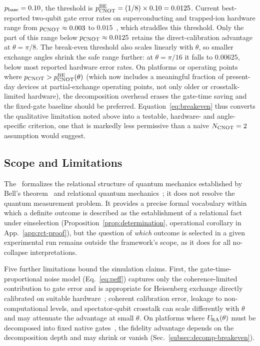 $p_{\rm base} = 0.10$, the threshold is
$p_{\rm CNOT}^{\rm BE} = (1/8)\times 0.10 = 0.0125$.
Current best-reported two-qubit gate error rates on superconducting
and trapped-ion hardware range from $p_{\rm CNOT} \approx 0.003$ to $0.015$~\cite{Krantz2019}, which straddles this threshold. Only the part of this range below $p_{\rm CNOT} \approx 0.0125$ retains the direct-calibration advantage at $\theta=\pi/8$. The break-even threshold also scales linearly with $\theta$, so smaller exchange angles shrink the safe range further: at $\theta = \pi/16$ it falls to $0.00625$, below most reported hardware error rates.
On platforms or operating points where $p_{\rm CNOT} > p_{\rm CNOT}^{\rm BE}(\theta)$ (which now includes a meaningful fraction of present-day devices at partial-exchange operating points, not only older or crosstalk-limited hardware), the decomposition overhead
erases the gate-time saving and the fixed-gate baseline should be
preferred.
Equation~\eqref{eq:breakeven} thus converts the qualitative limitation
noted above into a testable, hardware- and angle-specific criterion,
one that is markedly less permissive than a naive $N_{\rm CNOT}=2$
assumption would suggest.

\subsection{Scope and Limitations}
\label{subsec:limitations}

The \RCF~formalizes the relational structure of quantum mechanics
established by Bell's theorem~\cite{Bell1964} and relational quantum
mechanics~\cite{Rovelli1996,Rovelli2021}; it does not resolve the
quantum measurement problem.
It provides a precise formal vocabulary within which a definite outcome
is described as the establishment of a relational fact under
einselection (Proposition~\ref{prop:determination}, operational
corollary in App.~\ref{app:rct-proof}), but the question of
\emph{which} outcome is selected in a given experimental run remains
outside the framework's scope, as it does for all no-collapse
interpretations.

Five further limitations bound the simulation claims.
First, the gate-time-proportional noise model (Eq.~\eqref{eq:peff})
captures only the coherence-limited contribution to gate error and is
appropriate for Heisenberg exchange directly calibrated on suitable
hardware~\cite{LossDiVincenzo1998,Krantz2019,Caldwell2018,Foxen2020,Abrams2020};
coherent calibration error, leakage to non-computational levels, and
spectator-qubit crosstalk can scale differently with $\theta$ and may
attenuate the advantage at small $\theta$.
On platforms where $U_{\!\mathrm{RA}}(\theta)$ must be decomposed into fixed native
gates~\cite{VatanWilliams2004}, the fidelity advantage depends on the
decomposition depth and may shrink or vanish
(Sec.~\ref{subsec:decomp-breakeven}).

